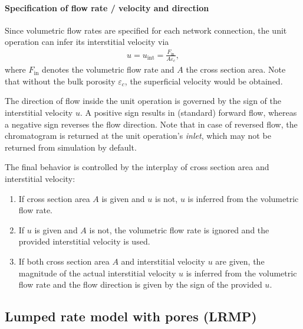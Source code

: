 \paragraph{Specification of flow rate / velocity and direction}
\label{par:MUOPGRMflow}

Since volumetric flow rates are specified for each network connection, the unit operation can infer its interstitial velocity via
\begin{align*}
	u = u_{\text{int}} = \frac{F_{\text{in}}}{A \varepsilon_c},
\end{align*}
where $F_{\text{in}}$ denotes the volumetric flow rate and $A$ the cross section area.
Note that without the bulk porosity $\varepsilon_c$, the superficial velocity would be obtained.

The direction of flow inside the unit operation is governed by the sign of the interstitial velocity $u$.
A positive sign results in (standard) forward flow, whereas a negative sign reverses the flow direction.
Note that in case of reversed flow, the chromatogram is returned at the unit operation's \emph{inlet}, which may not be returned from simulation by default.

The final behavior is controlled by the interplay of cross section area and interstitial velocity:
\begin{enumerate}
	\item If cross section area $A$ is given and $u$ is not, $u$ is inferred from the volumetric flow rate.
	\item If $u$ is given and $A$ is not, the volumetric flow rate is ignored and the provided interstitial velocity is used.
	\item If both cross section area $A$ and interstitial velocity $u$ are given, the magnitude of the actual interstitial velocity $u$ is inferred from the volumetric flow rate and the flow direction is given by the sign of the provided $u$.
\end{enumerate}

\subsection{Lumped rate model with pores (LRMP)}\label{sec:MUOPLRMP}

